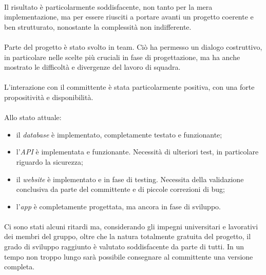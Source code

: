 \documentclass[12pt,a4paper,twoside,english,italian]{book}
\begin{document}
\paragraph{} Il risultato è particolarmente soddisfacente, non tanto per la mera implementazione, ma per essere riusciti a portare avanti un progetto coerente e ben strutturato, nonostante la complessità non indifferente. 

\paragraph{} Parte del progetto è stato svolto in team. Ciò ha permesso un dialogo costruttivo, in particolare nelle scelte più cruciali in fase di progettazione, ma ha anche mostrato le difficoltà e divergenze del lavoro di squadra. 

\paragraph{} L'interazione con il committente è stata particolarmente positiva, con una forte propositività e disponibilità. 

\paragraph{} Allo stato attuale:
\begin{itemize}
    \item il \emph{database} è implementato, completamente testato e funzionante;
    \item l'\emph{API} è implementata e funzionante. Necessità di ulteriori test, in particolare riguardo la sicurezza;
    \item il \emph{website} è implementato e in fase di testing. Necessita della validazione conclusiva da parte del committente e di piccole correzioni di bug;  
    \item l'\emph{app} è completamente progettata, ma ancora in fase di sviluppo. 
\end{itemize}

\paragraph{} Ci sono stati alcuni ritardi ma, considerando gli impegni universitari e lavorativi dei membri del gruppo, oltre che la natura totalmente gratuita del progetto, il grado di sviluppo raggiunto è valutato soddisfacente da parte di tutti. In un tempo non troppo lungo sarà possibile consegnare al committente una versione completa. 
\end{document}
